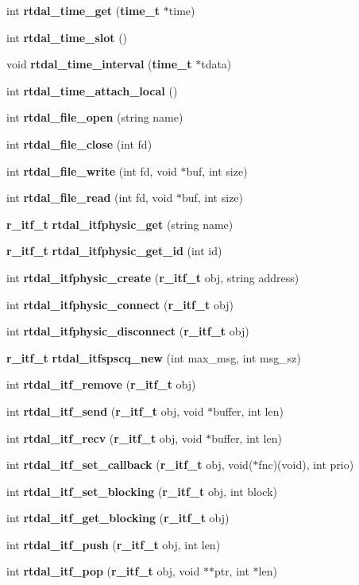 \begin{DoxyCompactItemize}
int {\bf rtdal\-\_\-time\-\_\-get} ({\bf time\-\_\-t} $\ast$time)
\item 
int {\bf rtdal\-\_\-time\-\_\-slot} ()
\item 
void {\bf rtdal\-\_\-time\-\_\-interval} ({\bf time\-\_\-t} $\ast$tdata)
\item 
int {\bf rtdal\-\_\-time\-\_\-attach\-\_\-local} ()
\item 
int {\bf rtdal\-\_\-file\-\_\-open} (string name)
\item 
int {\bf rtdal\-\_\-file\-\_\-close} (int fd)
\item 
int {\bf rtdal\-\_\-file\-\_\-write} (int fd, void $\ast$buf, int size)
\item 
int {\bf rtdal\-\_\-file\-\_\-read} (int fd, void $\ast$buf, int size)
\item 
{\bf r\-\_\-itf\-\_\-t} {\bf rtdal\-\_\-itfphysic\-\_\-get} (string name)
\item 
{\bf r\-\_\-itf\-\_\-t} {\bf rtdal\-\_\-itfphysic\-\_\-get\-\_\-id} (int id)
\item 
int {\bf rtdal\-\_\-itfphysic\-\_\-create} ({\bf r\-\_\-itf\-\_\-t} obj, string address)
\item 
int {\bf rtdal\-\_\-itfphysic\-\_\-connect} ({\bf r\-\_\-itf\-\_\-t} obj)
\item 
int {\bf rtdal\-\_\-itfphysic\-\_\-disconnect} ({\bf r\-\_\-itf\-\_\-t} obj)
\item 
{\bf r\-\_\-itf\-\_\-t} {\bf rtdal\-\_\-itfspscq\-\_\-new} (int max\-\_\-msg, int msg\-\_\-sz)
\item 
int {\bf rtdal\-\_\-itf\-\_\-remove} ({\bf r\-\_\-itf\-\_\-t} obj)
\item 
int {\bf rtdal\-\_\-itf\-\_\-send} ({\bf r\-\_\-itf\-\_\-t} obj, void $\ast$buffer, int len)
\item 
int {\bf rtdal\-\_\-itf\-\_\-recv} ({\bf r\-\_\-itf\-\_\-t} obj, void $\ast$buffer, int len)
\item 
int {\bf rtdal\-\_\-itf\-\_\-set\-\_\-callback} ({\bf r\-\_\-itf\-\_\-t} obj, void($\ast$fnc)(void), int prio)
\item 
int {\bf rtdal\-\_\-itf\-\_\-set\-\_\-blocking} ({\bf r\-\_\-itf\-\_\-t} obj, int block)
\item 
int {\bf rtdal\-\_\-itf\-\_\-get\-\_\-blocking} ({\bf r\-\_\-itf\-\_\-t} obj)
\item 
int {\bf rtdal\-\_\-itf\-\_\-push} ({\bf r\-\_\-itf\-\_\-t} obj, int len)
\item 
int {\bf rtdal\-\_\-itf\-\_\-pop} ({\bf r\-\_\-itf\-\_\-t} obj, void $\ast$$\ast$ptr, int $\ast$len)
$$
\end{DoxyCompactItemize}
